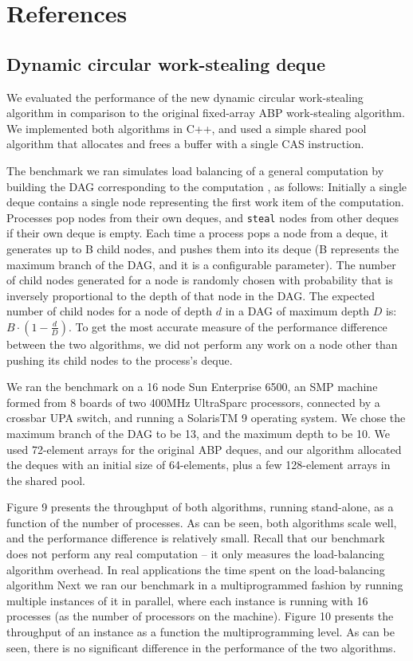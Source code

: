 \section{References}

\subsection{Dynamic circular work-stealing deque \cite{Chase2005}}

We evaluated the performance of the new dynamic circular work-stealing
algorithm in comparison to the original fixed-array ABP work-stealing
algorithm. We implemented both algorithms in C++, and used a simple
shared pool algorithm that allocates and frees a buffer with a single
CAS instruction.

The benchmark we ran simulates load balancing of a general computation
by building the DAG corresponding to the computation
\cite{Blumofe1999}, as follows: Initially a single deque contains a
single node representing the first work item of the
computation. Processes pop nodes from their own deques, and
\lstinline!steal! nodes from other deques if their own deque is
empty. Each time a process pops a node from a deque, it generates up
to B child nodes, and pushes them into its deque (B represents the
maximum branch of the DAG, and it is a configurable parameter). The
number of child nodes generated for a node is randomly chosen with
probability that is inversely proportional to the depth of that node
in the DAG. The expected number of child nodes for a node of depth $d$
in a DAG of maximum depth $D$ is: $B \cdot \left(1 - \frac{d}{D}
\right)$. To get the most accurate measure of the performance
difference between the two algorithms, we did not perform any work on
a node other than pushing its child nodes to the process's deque.

We ran the benchmark on a 16 node Sun Enterprise 6500, an SMP machine
formed from 8 boards of two 400MHz UltraSparc processors, connected by
a crossbar UPA switch, and running a SolarisTM 9 operating system. We
chose the maximum branch of the DAG to be 13, and the maximum depth to
be 10. We used 72-element arrays for the original ABP deques, and our
algorithm allocated the deques with an initial size of 64-elements,
plus a few 128-element arrays in the shared pool.

Figure 9 presents the throughput of both algorithms, running
stand-alone, as a function of the number of processes. As can be
seen, both algorithms scale well, and the performance difference is
relatively small. Recall that our benchmark does not perform any real
computation -- it only measures the load-balancing algorithm
overhead. In real applications the time spent on the load-balancing
algorithm Next we ran our benchmark in a multiprogrammed fashion by
running multiple instances of it in parallel, where each instance is
running with 16 processes (as the number of processors on the
machine). Figure 10 presents the throughput of an instance as a
function the multiprogramming level. As can be seen, there is no
significant difference in the performance of the two algorithms.

